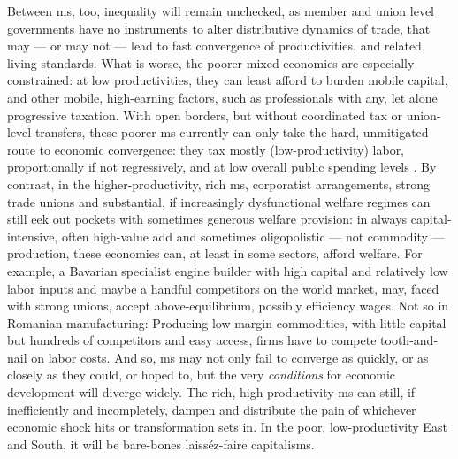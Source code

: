 Between \gls{ms}, too, inequality will remain unchecked, as member and union level governments have no instruments to alter distributive dynamics of trade, that may --- or may not --- lead to fast convergence of productivities, and related, living standards.
What is worse, the poorer mixed economies are especially constrained:
at low productivities, they can least afford to burden mobile capital, and other mobile, high-earning factors, such as professionals with any, let alone progressive taxation.
With open borders, but without coordinated tax or union-level transfers, these poorer \gls{ms} currently can only take the hard, unmitigated route to economic convergence:
they tax mostly (low-productivity) labor, proportionally if not regressively, and at low overall public spending levels \citep[for example,][267]{DaudUngl2008}.
By contrast, in the higher-productivity, rich \gls{ms}, corporatist arrangements, strong trade unions and substantial, if increasingly dysfunctional welfare regimes can still eek out pockets with sometimes generous welfare provision:
in always capital-intensive, often high-value add and sometimes oligopolistic --- not commodity ---production, these economies can, at least in some sectors, afford welfare.
For example, a Bavarian specialist engine builder with high capital and relatively low labor inputs and maybe a handful competitors on the world market,  may, faced with strong unions, accept above-equilibrium, possibly efficiency wages.
Not so in Romanian manufacturing:
Producing low-margin commodities, with little capital but hundreds of competitors and easy access, firms have to compete tooth-and-nail on labor costs.
And so, \gls{ms} may not only fail to converge as quickly, or as closely as they could, or hoped to, but the very \emph{conditions} for economic development will diverge widely.
The rich, high-productivity \gls{ms} can still, if inefficiently and incompletely, dampen and distribute the pain of whichever economic shock hits or transformation sets in.
In the poor, low-productivity East and South, it will be bare-bones laiss\'{e}z-faire capitalisms.

